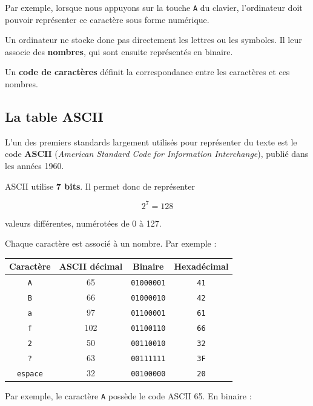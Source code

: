 \documentclass[11pt, a4paper]{book}
\begin{document}
Par exemple, lorsque nous appuyons sur la touche \texttt{A} du clavier, l'ordinateur
doit pouvoir représenter ce caractère sous forme numérique.

\begin{aretenir}
Un ordinateur ne stocke donc pas directement les lettres ou les symboles.
Il leur associe des \textbf{nombres}, qui sont ensuite représentés en binaire.

Un \textbf{code de caractères} définit la correspondance entre les caractères
et ces nombres.
\end{aretenir}


\subsection{La table ASCII}

L'un des premiers standards largement utilisés pour représenter du texte est le
code \textbf{ASCII} (\textit{American Standard Code for Information Interchange}),
publié dans les années 1960.

ASCII utilise \textbf{7 bits}. Il permet donc de représenter

\[
2^7 = 128
\]

valeurs différentes, numérotées de 0 à 127.

Chaque caractère est associé à un nombre. Par exemple :

\begin{center}
\renewcommand{\arraystretch}{1.25}
\begin{tabular}{cccc}
\toprule
\textbf{Caractère} & \textbf{ASCII décimal} & \textbf{Binaire} & \textbf{Hexadécimal} \\
\midrule
\texttt{A} & 65  & \texttt{01000001} & \texttt{41} \\
\texttt{B} & 66  & \texttt{01000010} & \texttt{42} \\
\texttt{a} & 97  & \texttt{01100001} & \texttt{61} \\
\texttt{f} & 102 & \texttt{01100110} & \texttt{66} \\
\texttt{2} & 50  & \texttt{00110010} & \texttt{32} \\
\texttt{?} & 63  & \texttt{00111111} & \texttt{3F} \\
\texttt{espace} & 32 & \texttt{00100000} & \texttt{20} \\
\bottomrule
\end{tabular}
\end{center}

Par exemple, le caractère \texttt{A} possède le code ASCII 65. En binaire :
\end{document}
